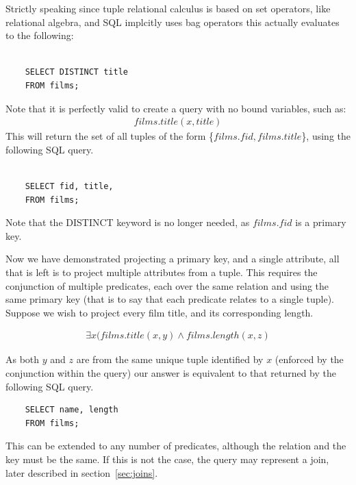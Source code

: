 \documentclass[a4paper, 11pt]{article}
\begin{document}
    Strictly speaking since tuple relational calculus is based on set
    operators, like relational algebra, and SQL implcitly uses bag operators
    this actually evaluates to the following:

    \begin{verbatim}

    SELECT DISTINCT title
    FROM films;

    \end{verbatim}

    Note that it is perfectly valid to create a query with no bound variables,
    such as:
    \begin{gather}
      films.title(x, title) \label{select2}
    \end{gather}
    This will return the set of all tuples of the form \{$films.fid,
    films.title$\}, using the following SQL query.

    \begin{verbatim}

    SELECT fid, title,
    FROM films;

    \end{verbatim}

    Note that the DISTINCT keyword is no longer needed, as $films.fid$ is a
    primary key.

    Now we have demonstrated projecting a primary key, and a single attribute,
    all that is left is to project multiple attributes from a tuple. This
    requires the conjunction of multiple predicates, each over the same
    relation and using the same primary key (that is to say that each predicate
    relates to a single tuple). Suppose we wish to project
    every film title, and its corresponding length.

    \begin{gather}
      \exists x(films.title(x, y) \land films.length(x, z)
    \end{gather}

    As both $y$ and $z$ are from the same unique tuple identified by $x$
    (enforced by the conjunction within the query) our
    answer is equivalent to that returned by the following SQL query.

    \begin{verbatim}
    SELECT name, length
    FROM films;
    \end{verbatim}

    This can be extended to any number of predicates, although the relation and
    the key must be the same. If this is not the case, the query may represent
    a join, later described in section~\ref{sec:joins}.
\end{document}

